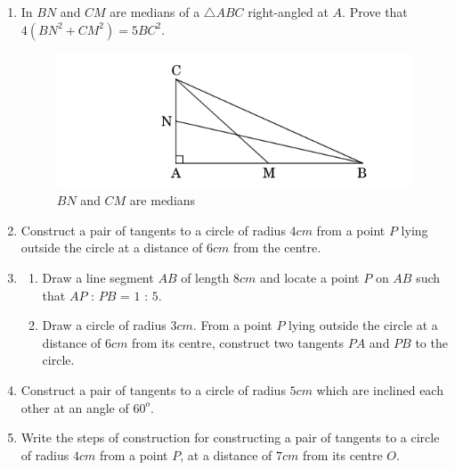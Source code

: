 \documentclass{article}
\theoremstyle{remark}
\begin{document}
\begin{enumerate}[label=\arabic*.,ref=\theenumi]
     \item In  $BN$ and $CM$ are medians of a  $\triangle ABC$ right-angled at $A$. Prove that $4 (BN^2 + CM^2) = 5 BC^2$.

    \begin{figure}[H]
        \centering
        \includegraphics[width=\columnwidth]{./figs/figure2.png}
        \caption{ $BN$ and $CM$ are medians}
        \label{fig:fig2.png}
    \end{figure}

     \item Construct a pair of tangents to a circle of radius $4cm$ from a point $P$ lying outside the circle at a distance of $6cm$ from the centre.


     \item     

     \begin{enumerate}[label=(\alph*)]

     \item Draw a line segment $AB$ of length $8cm$ and locate a point $P$ 
      on $AB$ such that $AP$ : $PB$ = $1$ : $5$.

      \item  Draw a circle of radius $3 cm$. From a point $P$ lying outside the 
       circle at a distance of $6cm$ from its centre, construct two tangents
       $PA$ and $PB$ to the circle.

       \end{enumerate}

       \item Construct a pair of tangents to a circle of radius $5cm$ which are inclined each other at an angle of $60^{o}$.


        \item Write the steps of construction for constructing a pair of
         tangents to a circle of radius $4cm$ from a point $P$, at a distance
         of $7cm$ from its centre $O$.
   
\end{enumerate} 
\end{document}
